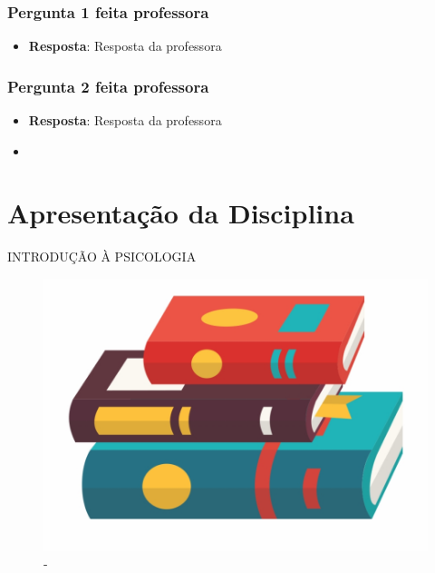 \documentclass[
]{book}
\providecommand{\tightlist}{%
  \setlength{\itemsep}{0pt}\setlength{\parskip}{0pt}}
\begin{document}
\hypertarget{pergunta-1-feita-professora}{%
\subsection{Pergunta 1 feita professora}\label{pergunta-1-feita-professora}}

\begin{itemize}
\tightlist
\item
  \textbf{Resposta}: Resposta da professora
\end{itemize}

\hypertarget{pergunta-2-feita-professora}{%
\subsection{Pergunta 2 feita professora}\label{pergunta-2-feita-professora}}

\begin{itemize}
\tightlist
\item
  \textbf{Resposta}: Resposta da professora
\end{itemize}

\begin{itemize}
\tightlist
\item
\end{itemize}

\hypertarget{apresentauxe7uxe3o-da-disciplina-1}{%
\chapter{Apresentação da Disciplina}\label{apresentauxe7uxe3o-da-disciplina-1}}

INTRODUÇÃO À PSICOLOGIA

\begin{figure}

{\centering \includegraphics[width=0.5\linewidth]{figuras/LIVRO-GENERICO} 

}

\caption{-}\label{fig:unnamed-chunk-15}
\end{figure}
\end{document}
